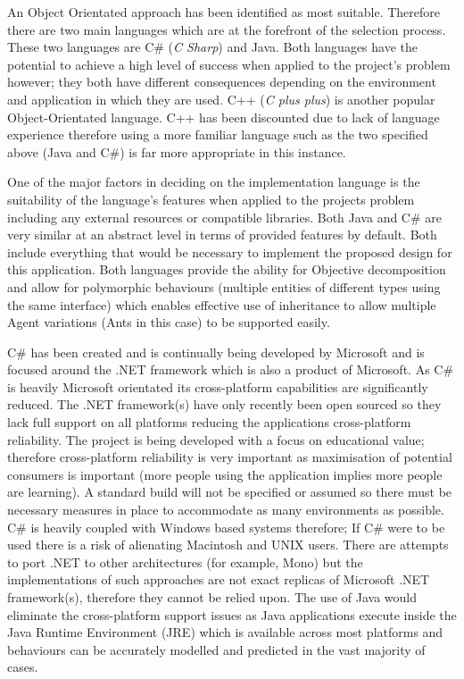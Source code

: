 \documentclass[10pt,a4paper]{article}
\begin{document}
An Object Orientated approach has been identified as most suitable. Therefore there are two main languages which are at the forefront of the selection process. These two languages are C\# (\textit{C Sharp}) and Java. Both languages have the potential to achieve a high level of success when applied to the project’s problem however; they both have different consequences depending on the environment and application in which they are used. C++ (\textit{C plus plus}) is another popular Object-Orientated language.  C++ has been discounted due to lack of language experience therefore using a more familiar language such as the two specified above (Java and C\#) is far more appropriate in this instance. 

One of the major factors in deciding on the implementation language is the suitability of the language’s features when applied to the projects problem including any external resources or compatible libraries. Both Java and C\# are very similar at an abstract level in terms of provided features by default. Both include everything that would be necessary to implement the proposed design for this application. Both languages provide the ability for Objective decomposition and allow for polymorphic behaviours (multiple entities of different types using the same interface) which enables effective use of inheritance to allow multiple Agent variations (Ants in this case) to be supported easily. 

C\# has been created and is continually being developed by Microsoft and is focused around the .NET framework which is also a product of Microsoft. As C\# is heavily Microsoft orientated its cross-platform capabilities are significantly reduced. The .NET framework(s) have only recently been open sourced so they lack full support on all platforms reducing the applications cross-platform reliability. The project is being developed with a focus on educational value; therefore cross-platform reliability is very important as maximisation of potential consumers is important (more people using the application implies more people are learning). A standard build will not be specified or assumed so there must be necessary measures in place to accommodate as many environments as possible. C\# is heavily coupled with Windows based systems therefore; If C\# were to be used there is a risk of alienating Macintosh and UNIX users. There are attempts to port .NET to other architectures (for example, Mono\cite{mono}) but the implementations of such approaches are not exact replicas of Microsoft .NET framework(s), therefore they cannot be relied upon. The use of Java would eliminate the cross-platform support issues as Java applications execute inside the Java Runtime Environment (JRE) which is available across most platforms and behaviours can be accurately modelled and predicted in the vast majority of cases.
\end{document}
